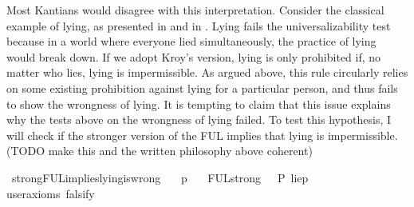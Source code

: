 \begin{isabellebody}
\begin{isamarkuptext}
Most Kantians would disagree with this interpretation. Consider the classical example of lying, as presented 
in \cite{kemp} and in \cite{KorsgaardFUL}. Lying fails the universalizability test because in a 
world where everyone lied simultaneously, the practice of lying would break down. If we adopt Kroy's 
version, lying is only prohibited if, no matter who lies, lying is impermissible. As argued above, this 
rule circularly relies on some existing prohibition against lying for a particular person, and thus 
fails to show the wrongness of lying. It is tempting to claim that this issue explains why the tests 
above on the wrongness of lying failed. To test this hypothesis, I will check if the stronger version 
of the FUL implies that lying is impermissible. (TODO make this and the written philosophy above coherent)%
\end{isamarkuptext}\isamarkuptrue%
\isamarkupfalse%
\ strongFUL{\isacharunderscore}implies{\isacharunderscore}lying{\isacharunderscore}is{\isacharunderscore}wrong{\isacharcolon}\isanewline
\ \ \ p\isanewline
\ \ \ {\isachardoublequoteopen}FUL{\isacharunderscore}strong\ {\isasymlongrightarrow}\ {\isasymTurnstile}{\isacharparenleft}\isactrlbold {\isasymnot}\ P\ {\isacharbraceleft}lie{\isacharparenleft}p{\isacharparenright}{\isacharbraceright}{\isacharparenright}{\isachardoublequoteclose}\isanewline
\ \ \isamarkupfalse%
{\isacharbrackleft}user{\isacharunderscore}axioms{\isacharcomma}\ falsify{\isacharbrackright}%
\isadelimproof
\ %
\endisadelimproof
%
\isatagproof
{}\isamarkupfalse%
\isanewline
%
\end{isabellebody}
